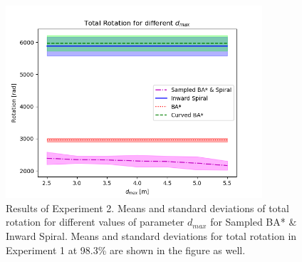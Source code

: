 \begin{figure}
\centering
    \includegraphics[width=0.85\textwidth]{figures/exp2_rotation.png}
    \caption{Results of Experiment 2. Means and standard deviations of total rotation for different values of parameter $d_{max}$ for Sampled BA* \& Inward Spiral. Means and standard deviations for total rotation in Experiment 1 at 98.3\% are shown in the figure as well.}
    \label{fig:exp2_rotation}
\end{figure}







